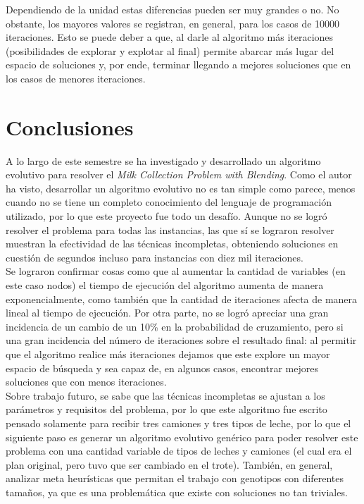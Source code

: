 \documentclass[letter, 10pt]{article}
\begin{document}
Dependiendo de la unidad estas diferencias pueden ser muy grandes o no. No obstante, los mayores valores se registran, en general, para los casos de 10000 iteraciones. Esto se puede deber a que, al darle al algoritmo más iteraciones (posibilidades de explorar y explotar al final) permite abarcar más lugar del espacio de soluciones y, por ende, terminar llegando a mejores soluciones que en los casos de menores iteraciones. 

\section{Conclusiones}

A lo largo de este semestre se ha investigado y desarrollado un algoritmo evolutivo para resolver el \textit{Milk Collection Problem with Blending}. Como el autor ha visto, desarrollar un algoritmo evolutivo no es tan simple como parece, menos cuando no se tiene un completo conocimiento del lenguaje de programación utilizado, por lo que este proyecto fue todo un desafío. Aunque no se logró resolver el problema para todas las instancias, las que sí se lograron resolver muestran la efectividad de las técnicas incompletas, obteniendo soluciones en cuestión de segundos incluso para instancias con diez mil iteraciones.\\

Se lograron confirmar cosas como que al aumentar la cantidad de variables (en este caso nodos) el tiempo de ejecución del algoritmo aumenta de manera exponencialmente, como también que la cantidad de iteraciones afecta de manera lineal al tiempo de ejecución. Por otra parte, no se logró apreciar una gran incidencia de un cambio de un 10\% en la probabilidad de cruzamiento, pero si una gran incidencia del número de iteraciones sobre el resultado final: al permitir que el algoritmo realice más iteraciones dejamos que este explore un mayor espacio de búsqueda y sea capaz de, en algunos casos, encontrar mejores soluciones que con menos iteraciones. \\

Sobre trabajo futuro, se sabe que las técnicas incompletas se ajustan a los parámetros y requisitos del problema, por lo que este algoritmo fue escrito pensado solamente para recibir tres camiones y tres tipos de leche, por lo que el siguiente paso es generar un algoritmo evolutivo genérico para poder resolver este problema con una cantidad variable de tipos de leches y camiones (el cual era el plan original, pero tuvo que ser cambiado en el trote). También, en general, analizar meta heurísticas que permitan el trabajo con genotipos con diferentes tamaños, ya que es una problemática que existe con soluciones no tan triviales.




\end{document}
